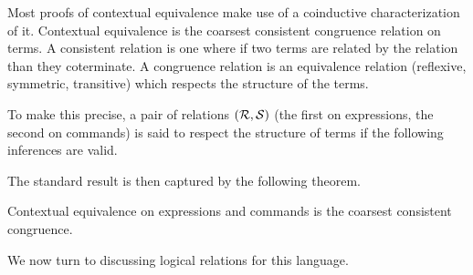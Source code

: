 Most proofs of contextual equivalence make use of a coinductive
characterization of it. Contextual equivalence is the coarsest
consistent congruence relation on terms. A consistent relation is one
where if two terms are related by the relation than they
coterminate. A congruence relation is an equivalence relation
(reflexive, symmetric, transitive) which respects the structure of the
terms.

To make this precise, a pair of relations $(\mathrel{\mathcal{R}}, \mathrel{\mathcal{S}})$ (the first
on expressions, the second on commands) is said to respect the
structure of terms if the following inferences are valid.
The standard result is then captured by the following theorem.
\begin{thm}\label{thm:language:cxt}
  Contextual equivalence on expressions and commands is the coarsest
  consistent congruence.
\end{thm}
We now turn to discussing logical relations for this language.


